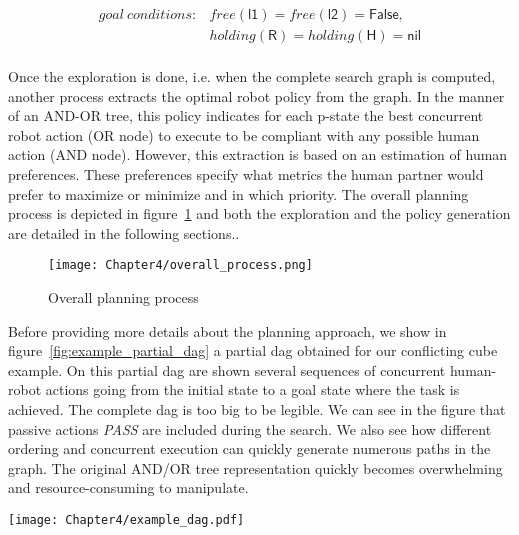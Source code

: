 {\small
\begin{align*}
goal~conditions: &free(\textsf{l1}) = free(\textsf{l2}) = \textsf{False}, \\
&holding(\textsf{R}) = holding(\textsf{H}) = \textsf{nil} \\
\end{align*}
}

Once the exploration is done, i.e. when the complete search graph is computed, another process extracts the optimal robot policy from the graph. In the manner of an AND-OR tree, this policy indicates for each p-state the best concurrent robot action (OR node) to execute to be compliant with any possible human action (AND node). However, this extraction is based on an estimation of human preferences. These preferences specify what metrics the human partner would prefer to maximize or minimize and in which priority. The overall planning process is depicted in figure~\ref{fig:overall_process} and both the exploration and the policy generation are detailed in the following sections..


\begin{figure}[h]
    \texttt{[image: Chapter4/overall\_process.png]}
    \caption{Overall planning process}
    \label{fig:overall_process}
\end{figure}

Before providing more details about the planning approach, we show in figure~\ref{fig:example_partial_dag} a partial \acrshort{dag} obtained for our conflicting cube example. On this partial \acrshort{dag} are shown several sequences of concurrent human-robot actions going from the initial state to a goal state where the task is achieved. The complete \acrshort{dag} is too big to be legible. We can see in the figure that passive actions \textit{PASS} are included during the search. We also see how different ordering and concurrent execution can quickly generate numerous paths in the graph. The original AND/OR tree representation quickly becomes overwhelming and resource-consuming to manipulate. 

\begin{sidewaysfigure}
    \texttt{[image: Chapter4/example\_dag.pdf]}
    \caption{Partial Directed Acyclic Graph (DAG) for the conflicting pick example.}
    \label{fig:example_partial_dag}
\end{sidewaysfigure}

